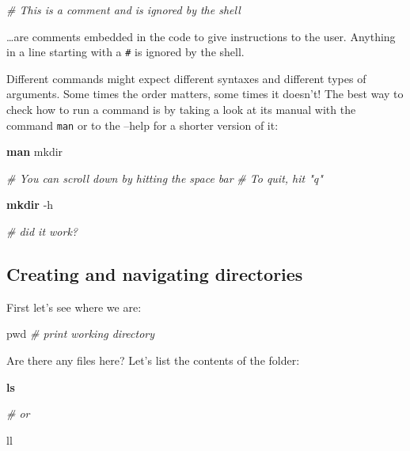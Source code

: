 \documentclass[
]{book}
\newenvironment{Shaded}{\begin{snugshade}}{\end{snugshade}}
\newcommand{\AttributeTok}[1]{\textcolor[rgb]{0.13,0.29,0.53}{#1}}
\newcommand{\BuiltInTok}[1]{#1}
\newcommand{\CommentTok}[1]{\textcolor[rgb]{0.56,0.35,0.01}{\textit{#1}}}
\newcommand{\ExtensionTok}[1]{#1}
\newcommand{\FunctionTok}[1]{\textcolor[rgb]{0.13,0.29,0.53}{\textbf{#1}}}
\newcommand{\NormalTok}[1]{#1}
\begin{document}
\begin{Shaded}
\begin{Highlighting}[]
\CommentTok{\# This is a comment and is ignored by the shell}
\end{Highlighting}
\end{Shaded}

\ldots are comments embedded in the code to give instructions to the user.
Anything in a line starting with a \texttt{\#} is ignored by the shell.

Different commands might expect different syntaxes and different types of arguments. Some times the order matters, some times it doesn't! The best way to check how to run a command is by taking a look at its manual with the command \texttt{man} or to the --help for a shorter version of it:

\begin{Shaded}
\begin{Highlighting}[]
\FunctionTok{man}\NormalTok{ mkdir}

\CommentTok{\# You can scroll down by hitting the space bar}
\CommentTok{\# To quit, hit "q"}

\FunctionTok{mkdir} \AttributeTok{{-}h}

\CommentTok{\# did it work?}
\end{Highlighting}
\end{Shaded}

\hypertarget{creating-and-navigating-directories}{%
\subsection{Creating and navigating directories}\label{creating-and-navigating-directories}}

First let's see where we are:

\begin{Shaded}
\begin{Highlighting}[]
\BuiltInTok{pwd}  \CommentTok{\# print working directory}
\end{Highlighting}
\end{Shaded}

Are there any files here? Let's list the contents of the folder:

\begin{Shaded}
\begin{Highlighting}[]
\FunctionTok{ls}

\CommentTok{\# or }

\ExtensionTok{ll}
\end{Highlighting}
\end{Shaded}
\end{document}
